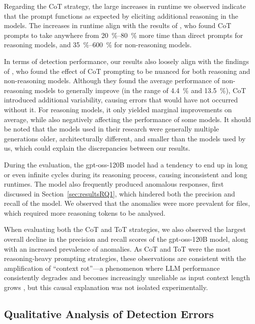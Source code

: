 Regarding the CoT strategy, the large increases in runtime we observed indicate that the prompt functions as expected by eliciting additional reasoning in the models. The increases in runtime align with the results of , who found CoT prompts to take anywhere from \qtyrange[range-phrase = --, range-units = single]{20}{80}{\percent} more time than direct prompts for reasoning models, and \qtyrange[range-phrase = --, range-units = single]{35}{600}{\percent} for non-reasoning models. 

In terms of detection performance, our results also loosely align with the findings of , who found the effect of CoT prompting to be nuanced for both reasoning and non-reasoning models. Although they found the average performance of non-reasoning models to generally improve (in the range of \qty{4.4}{\percent} and \qty{13.5}{\percent}), CoT introduced additional variability, causing errors that would have not occurred without it. For reasoning models, it only yielded marginal improvements on average, while also negatively affecting the performance of some models. It should be noted that the models used in their research were generally multiple generations older, architecturally different, and smaller than the models used by us, which could explain the discrepancies between our results.

During the evaluation, the gpt-oss-120B model had a tendency to end up in long or even infinite cycles during its reasoning process, causing inconsistent and long runtimes. The model also frequently produced anomalous responses, first discussed in Section~\ref{sec:resultsRQ1}, which hindered both the precision and recall of the model. We observed that the anomalies were more prevalent for files, which required more reasoning tokens to be analysed. 

When evaluating both the CoT and ToT strategies, we also observed the largest overall decline in the precision and recall scores of the gpt-oss-120B model, along with an increased prevalence of anomalies. As CoT and ToT were the most reasoning-heavy prompting strategies, these observations are consistent with the amplification of “context rot”—a phenomenon where LLM performance consistently degrades and becomes increasingly unreliable as input context length grows , but this causal explanation was not isolated experimentally. 

\subsection{Qualitative Analysis of Detection Errors}\label{sec:detectionErrors}

